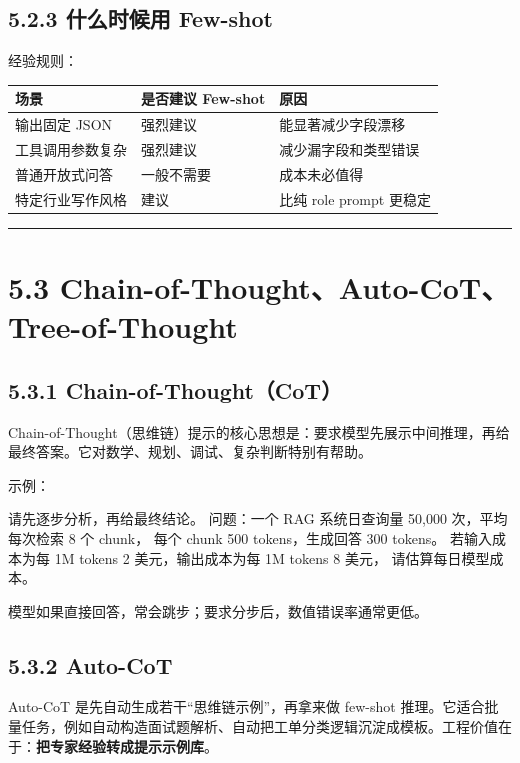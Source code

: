 \subsection{5.2.3 什么时候用 Few-shot}

经验规则：


\begingroup
\scriptsize
\setlength{\tabcolsep}{3pt}
\begin{longtable}{|p{}|p{}|p{}|}
\hline
场景 & 是否建议 Few-shot & 原因 \\ \hline
输出固定 JSON & 强烈建议 & 能显著减少字段漂移 \\ \hline
工具调用参数复杂 & 强烈建议 & 减少漏字段和类型错误 \\ \hline
普通开放式问答 & 一般不需要 & 成本未必值得 \\ \hline
特定行业写作风格 & 建议 & 比纯 role prompt 更稳定 \\ \hline
\end{longtable}
\endgroup

\bigskip\hrule\bigskip

\section{5.3 Chain-of-Thought、Auto-CoT、Tree-of-Thought}

\subsection{5.3.1 Chain-of-Thought（CoT）}

Chain-of-Thought（思维链）提示的核心思想是：要求模型先展示中间推理，再给最终答案。它对数学、规划、调试、复杂判断特别有帮助。


示例：


\begin{codeblock}
请先逐步分析，再给最终结论。
问题：一个 RAG 系统日查询量 50,000 次，平均每次检索 8 个 chunk，
每个 chunk 500 tokens，生成回答 300 tokens。
若输入成本为每 1M tokens 2 美元，输出成本为每 1M tokens 8 美元，
请估算每日模型成本。
\end{codeblock}

模型如果直接回答，常会跳步；要求分步后，数值错误率通常更低。


\subsection{5.3.2 Auto-CoT}

Auto-CoT 是先自动生成若干``思维链示例''，再拿来做 few-shot 推理。它适合批量任务，例如自动构造面试题解析、自动把工单分类逻辑沉淀成模板。工程价值在于：\textbf{把专家经验转成提示示例库}。



